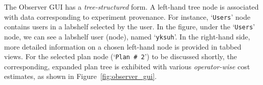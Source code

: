 \documentclass{vldb}
\def\azdb{\hbox{\sc AZDBLab}}
\begin{document}


The \hbox{Observer} \hbox{GUI} has a {\em tree-structured} form. 
A left-hand tree node is associated with data \hbox{corresponding} to \hbox{experiment} provenance. 
For instance, `{\tt Users}' node \hbox{contains} users in a labshelf selected by the user. 
In the figure, \hbox{under} the `{\tt Users}' node, we can see a \hbox{labshelf} user (node), named `{\tt yksuh}'. 
In the right-hand side, more detailed information on a \hbox{chosen} left-hand node is \hbox{provided} in tabbed views. 
For the selected plan node (`{\tt Plan \# 2}') to be discussed shortly, 
the \hbox{corresponding}, expanded plan tree is exhibited with \linebreak \hbox{various} {\em operator-wise} cost estimates, as shown in Figure~\ref{fig:observer_gui}.

\end{document}
